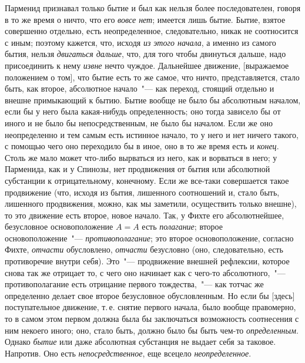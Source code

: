 Парменид признавал только бытие и был как нельзя
более последователен, говоря в то же время о ничто, что
его \emph{вовсе нет}; имеется лишь бытие. Бытие, взятое совершенно
отдельно, есть неопределенное, следовательно, никак
не соотносится с иным; поэтому кажется, что, исходя
\emph{из этого начала}, а именно из самого бытия, нельзя
\emph{двигаться дальше}, что, для того чтобы двинуться дальше,
надо присоединить к нему \emph{извне} нечто чуждое. Дальнейшее
движение, [выражаемое положением о том], что бытие
есть то же самое, что ничто, представляется, стало
быть, как второе, абсолютное начало~"--- как переход, стоящий
отдельно и внешне примыкающий к бытию. Бытие
вообще не было бы абсолютным началом, если бы у него
была какая-нибудь определенность; оно тогда зависело бы
от иного и не было бы непосредственным, не было бы началом.
Если же оно неопределенно и тем самым есть
истинное начало, то у него и нет ничего такого, с помощью
чего оно переходило бы в иное, оно в то же время
есть и \emph{конец}. Столь же мало может что-либо вырваться
из него, как и ворваться в него; у Парменида, как и у
Спинозы, нет продвижения от бытия или абсолютной субстанции
к отрицательному, конечному. Если же все-таки
совершается такое продвижение (что, исходя из бытия,
лишенного соотношений и, стало быть, лишенного продвижения,
можно, как мы заметили, осуществить только
внешне), то это движение есть второе, новое начало. Так,
у Фихте его абсолютнейшее, безусловное основоположение
$A = A$ есть \emph{полагание}; второе основоположение~"---
\emph{противополагание}; это второе основоположение, согласно
Фихте, \emph{отчасти} обусловлено, \emph{отчасти} безусловно (оно,
следовательно, есть противоречие внутри себя). Это~"---
продвижение внешней рефлексии, которое снова так же
отрицает то, с чего оно начинает как с чего-то абсолютного,~"---
противополагание есть отрицание первого тождества,~"---
как тотчас же определенно делает свое второе
безусловное обусловленным. Но если бы [здесь] поступательное
движение, т.\,е. снятие первого начала, было вообще
правомерно, то в самом этом первом должна была
бы заключаться возможность соотнесения с ним некоего
иного; оно, стало быть, должно было бы быть чем-то \emph{определенным}.
Однако \emph{бытие} или даже абсолютная субстанция
не выдает себя за таковое. Напротив. Оно есть \emph{непосредственное},
еще всецело \emph{неопределенное}.

